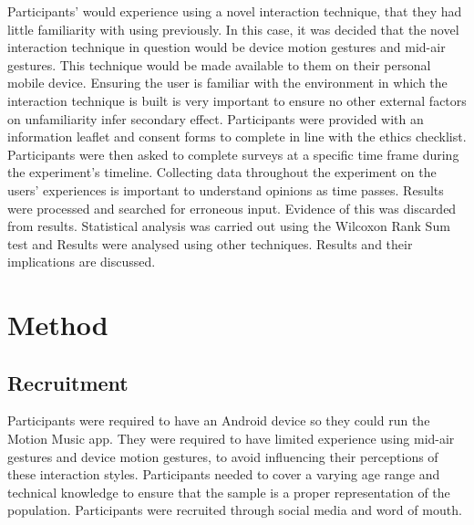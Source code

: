 \documentclass{l4proj}
\begin{document}
Participants' would experience using a novel interaction technique, that they had little familiarity with using previously. In this case, it was decided that the novel interaction technique in question would be device motion gestures and mid-air gestures. This technique would be made available to them on their personal mobile device. Ensuring the user is familiar with the environment in which the interaction technique is built is very important to ensure no other external factors on unfamiliarity infer secondary effect. Participants were provided with an information leaflet and consent forms to complete in line with the ethics checklist. Participants were then asked to complete surveys at a specific time frame during the experiment’s timeline. Collecting data throughout the experiment on the users' experiences is important to understand opinions as time passes. Results were processed and searched for erroneous input. Evidence of this was discarded from results. Statistical analysis was carried out using the Wilcoxon Rank Sum test and Results were analysed using other techniques. Results and their implications are discussed.


\section{Method}

\subsection{Recruitment}

Participants were required to have an Android device so they could run the Motion Music app. They were required to have limited experience using mid-air gestures and device motion gestures, to avoid influencing their perceptions of these interaction styles. Participants needed to cover a varying age range and technical knowledge to ensure that the sample is a proper representation of the population. Participants were recruited through social media and word of mouth.
\end{document}
